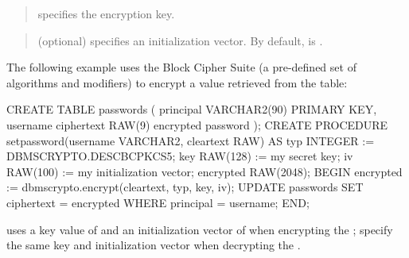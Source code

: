 \documentclass[letterpaper,10pt,english,openany,oneside]{sphinxmanual}
\begin{document}
\begin{quote}

 specifies the encryption key.
\end{quote}

\begin{quote}

 (optional) specifies an initialization vector. By default, 
is .
\end{quote}


The following example uses the  Block Cipher
Suite (a pre-defined set of algorithms and modifiers) to encrypt a value
retrieved from the  table:

%
\begin{sphinxVerbatim}[commandchars=\\\{\}]
CREATE TABLE passwords
(
 principal   VARCHAR2(90) PRIMARY KEY, \PYGZhy{}\PYGZhy{} username
 ciphertext  RAW(9) \PYGZhy{}\PYGZhy{} encrypted password
);
CREATE PROCEDURE set\PYGZus{}password(username VARCHAR2, cleartext RAW) AS
 typ         INTEGER := DBMS\PYGZus{}CRYPTO.DES\PYGZus{}CBC\PYGZus{}PKCS5;
 key         RAW(128) := \PYGZsq{}my secret key\PYGZsq{};
 iv          RAW(100) := \PYGZsq{}my initialization vector\PYGZsq{};
 encrypted   RAW(2048);
BEGIN
 encrypted := dbms\PYGZus{}crypto.encrypt(cleartext, typ, key, iv);
 UPDATE passwords SET ciphertext = encrypted WHERE principal =
 username;
END;
\end{sphinxVerbatim}

 uses a key value of  and an initialization vector
of  when encrypting the ; specify the
same key and initialization vector when decrypting the .

\newpage
\end{document}
